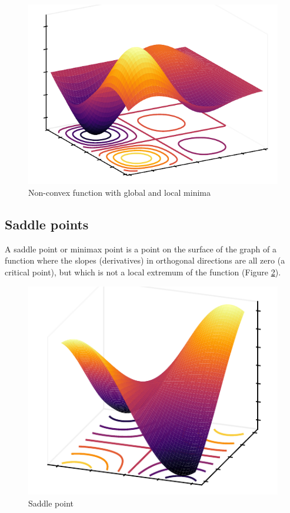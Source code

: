 \begin{figure}[h]
    \centering
    \includegraphics{figures/global_local_minima.pdf}
    \caption{Non-convex function with global and local minima}
    \label{fig:global_local_minima}
\end{figure}

\subsection{Saddle points}
A saddle point or minimax point is a point on the surface of the graph of a function where the slopes (derivatives) in orthogonal directions are all zero (a critical point), but which is not a local extremum of the function (Figure \ref{fig:saddle-point}).

\begin{figure}[h]
    \centering
    \includegraphics{figures/saddle_point.pdf}
    \caption{Saddle point}
    \label{fig:saddle-point}
\end{figure}

